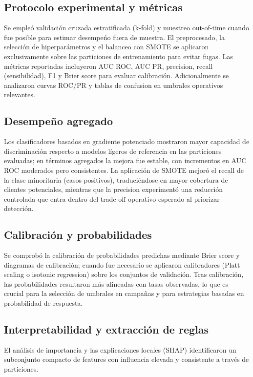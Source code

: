 \documentclass[12pt,a4paper]{article}
\begin{document}
\subsection{Protocolo experimental y m\'etricas}
Se emple\'o validaci\'on cruzada estratificada (k-fold) y muestreo out-of-time cuando fue posible para estimar desempe\'no fuera de muestra. El preprocesado, la selecci\'on de hiperpar\'ametros y el balanceo con SMOTE se aplicaron exclusivamente sobre las particiones de entrenamiento para evitar fugas. Las m\'etricas reportadas incluyeron AUC ROC, AUC PR, precision, recall (sensibilidad), F1 y Brier score para evaluar calibraci\'on. Adicionalmente se analizaron curvas ROC/PR y tablas de confusion en umbrales operativos relevantes.

\subsection{Desempe\~no agregado}
Los clasificadores basados en gradiente potenciado mostraron mayor capacidad de discriminaci\'on respecto a modelos l\'igeros de referencia en las particiones evaluadas; en t\'erminos agregados la mejora fue estable, con incrementos en AUC ROC moderados pero consistentes. La aplicaci\'on de SMOTE mejor\'o el recall de la clase minoritaria (casos positivos), traduci\'endose en mayor cobertura de clientes potenciales, mientras que la precision experiment\'o una reducci\'on controlada que entra dentro del trade-off operativo esperado al priorizar detecci\'on.

\subsection{Calibraci\'on y probabilidades}
Se comprob\'o la calibraci\'on de probabilidades predichas mediante Brier score y diagramas de calibraci\'on; cuando fue necesario se aplicaron calibradores (Platt scaling o isotonic regression) sobre los conjuntos de validaci\'on. Tras calibraci\'on, las probabilidades resultaron m\'as alineadas con tasas observadas, lo que es crucial para la selecci\'on de umbrales en campa\~nas y para estrategias basadas en probabilidad de respuesta.

\subsection{Interpretabilidad y extracci\'on de reglas}
El an\'alisis de importancia y las explicaciones locales (SHAP) identificaron un subconjunto compacto de features con influencia elevada y consistente a trav\'es de particiones. %
\end{document}
